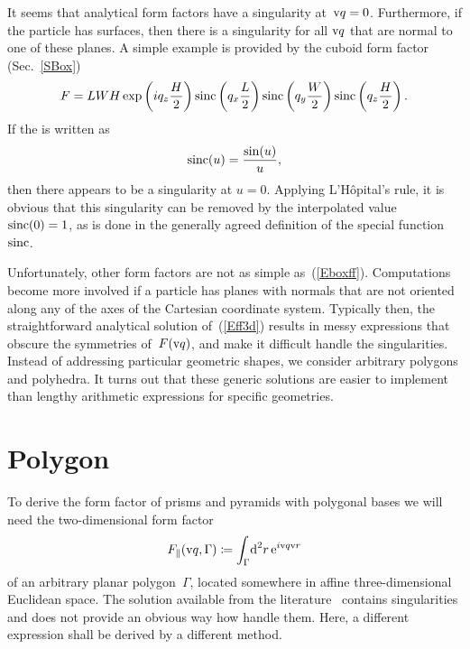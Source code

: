 %
It seems that  analytical form factors have a singularity at~$\text{v}{q}=0$.
Furthermore, if the particle has  surfaces,
then there is a singularity for all $\text{v}{q}$ that are normal to one of these planes.
A simple example is provided by the cuboid form factor (Sec.~\ref{SBox})
\begin{equation}\label{Eboxff}
F= L W H\exp\left(i q_z \frac{H}{2}\right) \operatorname{sinc}\left(q_x \frac{L}{2}\right)
\operatorname{sinc}\left(q_y \frac{W}{2}\right) \operatorname{sinc}\left(q_z \frac{H}{2}\right).
\end{equation}
If the  is written as
\begin{equation}\label{Esinc}
  \operatorname{sinc}(u) = \frac{\sin(u)}{u},
\end{equation}
then there appears to be a singularity at $u=0$.
Applying L'H\^opital's rule, it is obvious
that this singularity can be removed by the interpolated value
$\operatorname{sinc}(0)=1$,
as is done in the generally agreed definition of the special function~$\operatorname{sinc}$.

Unfortunately, other form factors are not as simple as~(\ref{Eboxff}).
Computations become more involved
if a particle has planes with normals that are not oriented along
any of the axes of the Cartesian coordinate system.
Typically then, the straightforward analytical solution of~(\ref{Eff3d})
results in messy expressions that obscure the symmetries of~$F(\text{v}{q})$,
and make it difficult handle the singularities.
Instead of addressing particular geometric shapes,
we consider arbitrary polygons and polyhedra.
It turns out that these generic solutions
are easier to implement
than lengthy arithmetic expressions for specific geometries.


\section{Polygon}\label{SFFPolygon}

%

To derive the form factor of prisms and pyramids with polygonal bases
we will need the two-dimensional form factor
\begin{equation}\label{Eff2d}
  F_\parallel(\text{v}{q},\Gamma)
  \coloneqq \int_{\Gamma}\!\text{d}^2r\, \text{e}^{i\text{v}{q}\text{v}{r}}
\end{equation}
of an arbitrary planar polygon~$\Gamma$,
located somewhere in affine three-dimensional Euclidean space.
The solution available from the literature~\cite{LeMi83}
contains singularities and does not provide an obvious way how handle them.
Here, a different expression shall be derived by a different method.

